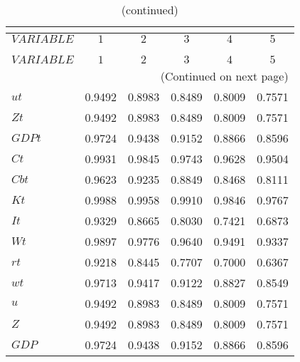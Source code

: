  
\begin{center}
\begin{longtable}{lccccc} 
\caption{AUTOCORRELATION OF SIMULATED VARIABLES}\\
 \label{Table:sim_autocorr_matrix}\\
\toprule 
$VARIABLE  $	 & 	 $         1$	 & 	 $         2$	 & 	 $         3$	 & 	 $         4$	 & 	 $         5$\\
\midrule \endfirsthead 
\caption{(continued)}\\
 \toprule \\ 
$VARIABLE  $	 & 	 $         1$	 & 	 $         2$	 & 	 $         3$	 & 	 $         4$	 & 	 $         5$\\
\midrule \endhead 
\midrule \multicolumn{6}{r}{(Continued on next page)} \\ \bottomrule \endfoot 
\bottomrule \endlastfoot 
$ut        $	 & 	    0.9492	 & 	    0.8983	 & 	    0.8489	 & 	    0.8009	 & 	    0.7571 \\ 
$Zt        $	 & 	    0.9492	 & 	    0.8983	 & 	    0.8489	 & 	    0.8009	 & 	    0.7571 \\ 
$GDPt      $	 & 	    0.9724	 & 	    0.9438	 & 	    0.9152	 & 	    0.8866	 & 	    0.8596 \\ 
$Ct        $	 & 	    0.9931	 & 	    0.9845	 & 	    0.9743	 & 	    0.9628	 & 	    0.9504 \\ 
$Cbt       $	 & 	    0.9623	 & 	    0.9235	 & 	    0.8849	 & 	    0.8468	 & 	    0.8111 \\ 
$Kt        $	 & 	    0.9988	 & 	    0.9958	 & 	    0.9910	 & 	    0.9846	 & 	    0.9767 \\ 
$It        $	 & 	    0.9329	 & 	    0.8665	 & 	    0.8030	 & 	    0.7421	 & 	    0.6873 \\ 
$Wt        $	 & 	    0.9897	 & 	    0.9776	 & 	    0.9640	 & 	    0.9491	 & 	    0.9337 \\ 
$rt        $	 & 	    0.9218	 & 	    0.8445	 & 	    0.7707	 & 	    0.7000	 & 	    0.6367 \\ 
$wt        $	 & 	    0.9713	 & 	    0.9417	 & 	    0.9122	 & 	    0.8827	 & 	    0.8549 \\ 
$u         $	 & 	    0.9492	 & 	    0.8983	 & 	    0.8489	 & 	    0.8009	 & 	    0.7571 \\ 
$Z         $	 & 	    0.9492	 & 	    0.8983	 & 	    0.8489	 & 	    0.8009	 & 	    0.7571 \\ 
$GDP       $	 & 	    0.9724	 & 	    0.9438	 & 	    0.9152	 & 	    0.8866	 & 	    0.8596 \\ 

\end{longtable}
\end{center}
